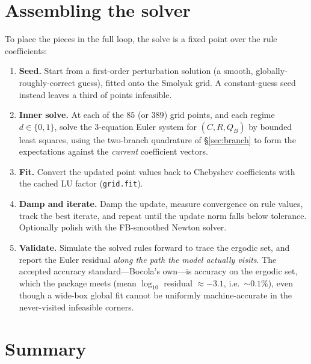 \documentclass[11pt]{article}
\newcommand{\code}[1]{\texttt{#1}}
\begin{document}
\section{Assembling the solver}
\label{sec:assemble}

To place the pieces in the full loop, the solve is a fixed point over the
rule coefficients:
\begin{enumerate}
\item \textbf{Seed.} Start from a first-order perturbation solution (a smooth,
      globally-roughly-correct guess), fitted onto the Smolyak grid. A
      constant-guess seed instead leaves a third of points infeasible.
\item \textbf{Inner solve.} At each of the $85$ (or $389$) grid points, and
      each regime $d\in\{0,1\}$, solve the $3$-equation Euler system for
      $(C,R,Q_B)$ by bounded least squares, using the two-branch quadrature
      of \S\ref{sec:branch} to form the expectations against the
      \emph{current} coefficient vectors.
\item \textbf{Fit.} Convert the updated point values back to Chebyshev
      coefficients with the cached LU factor (\code{grid.fit}).
\item \textbf{Damp and iterate.} Damp the update, measure convergence on
      rule values, track the best iterate, and repeat until the update norm
      falls below tolerance. Optionally polish with the FB-smoothed Newton
      solver.
\item \textbf{Validate.} Simulate the solved rules forward to trace the
      ergodic set, and report the Euler residual \emph{along the path the
      model actually visits}. The accepted accuracy standard---Bocola's
      own---is accuracy on the ergodic set, which the package meets (mean
      $\log_{10}$ residual $\approx-3.1$, i.e.\ $\sim0.1\%$), even though a
      wide-box global fit cannot be uniformly machine-accurate in the
      never-visited infeasible corners.
\end{enumerate}


\section{Summary}
\label{sec:summary}
\end{document}
